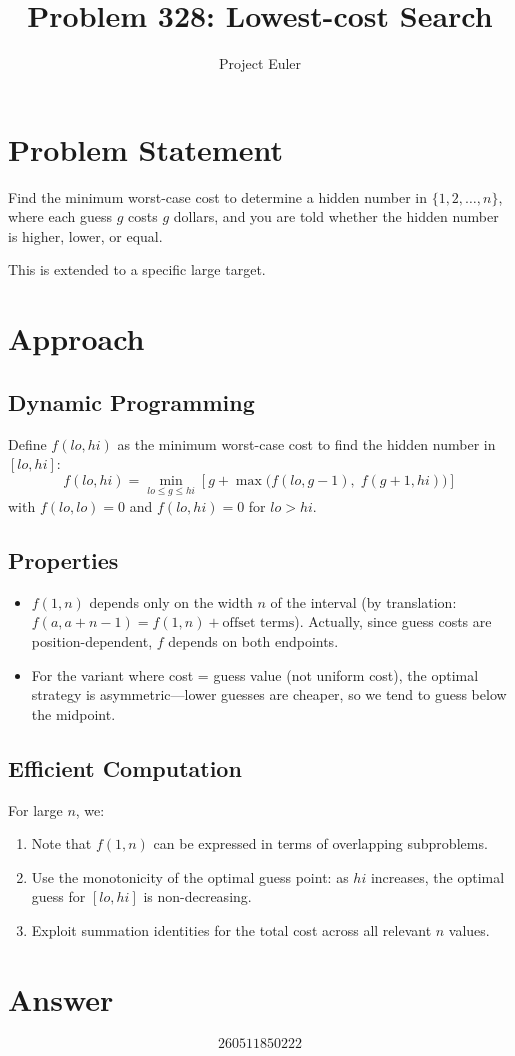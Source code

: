 \documentclass{article}
\title{Problem 328: Lowest-cost Search}
\author{Project Euler}
\date{}
\begin{document}
\maketitle

\section{Problem Statement}
Find the minimum worst-case cost to determine a hidden number in $\{1, 2, \ldots, n\}$, where each guess $g$ costs $g$ dollars, and you are told whether the hidden number is higher, lower, or equal.

This is extended to a specific large target.

\section{Approach}

\subsection{Dynamic Programming}
Define $f(lo, hi)$ as the minimum worst-case cost to find the hidden number in $[lo, hi]$:
\[
f(lo, hi) = \min_{lo \le g \le hi} \left[ g + \max\bigl(f(lo, g-1),\; f(g+1, hi)\bigr) \right]
\]
with $f(lo, lo) = 0$ and $f(lo, hi) = 0$ for $lo > hi$.

\subsection{Properties}
\begin{itemize}
    \item $f(1, n)$ depends only on the width $n$ of the interval (by translation: $f(a, a+n-1) = f(1, n) + \text{offset terms}$). Actually, since guess costs are position-dependent, $f$ depends on both endpoints.
    \item For the variant where cost = guess value (not uniform cost), the optimal strategy is asymmetric---lower guesses are cheaper, so we tend to guess below the midpoint.
\end{itemize}

\subsection{Efficient Computation}
For large $n$, we:
\begin{enumerate}
    \item Note that $f(1, n)$ can be expressed in terms of overlapping subproblems.
    \item Use the monotonicity of the optimal guess point: as $hi$ increases, the optimal guess for $[lo, hi]$ is non-decreasing.
    \item Exploit summation identities for the total cost across all relevant $n$ values.
\end{enumerate}

\section{Answer}

\[
\boxed{260511850222}
\]
\end{document}
